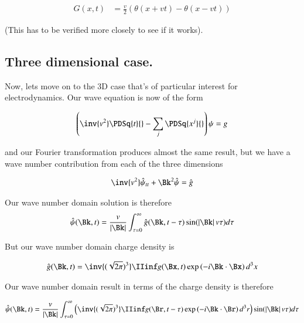 \begin{align}
G(x, t) &= \frac{v}{2} \left(\theta(x + v t )  - \theta(x - v t) \right) 
\end{align}

(This has to be verified more closely to see if it works).

\subsection{Three dimensional case. }

Now, lets move on to the 3D case that's of particular interest for electrodynamics.  Our wave equation is now of the form

\begin{align}
\left( \inv{v^2} \PDSq{t}{} -\sum_j \PDSq{x^j}{} \right)\psi = g
\end{align}

and our Fourier transformation produces almost the same result, but we have a wave number contribution from each of the three dimensions

\begin{align}
\inv{v^2}\hat{\psi}_{tt} + \Bk^2 \hat{\psi} = \hat{g}
\end{align}

Our wave number domain solution is therefore
\begin{align}\label{eqn:fourier_maxwell:waveNumDomainSolution}
\hat{\psi}(\Bk, t) = \frac{v}{\Abs{\Bk}} \int_{\tau = 0}^\infty \hat{g}(\Bk, t-\tau) \sin( \Abs{\Bk} v \tau ) d\tau
\end{align}

But our wave number domain charge density is

\begin{align*}
\hat{g}(\Bk, t) &= \inv{(\sqrt{2\pi})^3} \IIinf g(\Bx, t) \exp\left( -i \Bk \cdot \Bx \right) d^3 x \\
\end{align*}

Our wave number domain result in terms of the charge density is therefore

\begin{align*}
\hat{\psi}(\Bk, t) =
\frac{v}{\Abs{\Bk}} \int_{\tau = 0}^\infty
\left(
\inv{(\sqrt{2\pi})^3} \IIinf g(\Br, t-\tau) \exp\left( -i \Bk \cdot \Br \right) d^3 r
\right)
\sin( \Abs{\Bk} v \tau ) d\tau
\end{align*}

